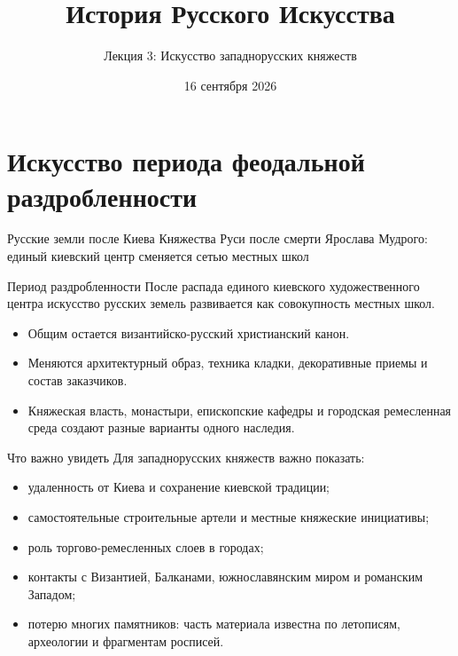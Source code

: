 
{
  \title{История Русского Искусства}
  \subtitle{Лекция 3: Искусство западнорусских княжеств}
  \date{16 сентября 2026}

  \begin{frame}
    \titlepage
  \end{frame}
}

\section{Искусство периода феодальной раздробленности}

\begin{frame}{Русские земли после Киева}
    {Княжества Руси после смерти Ярослава Мудрого:
     единый киевский центр сменяется сетью местных школ}
\end{frame}

\begin{frame}{Период раздробленности}
  После распада единого киевского художественного центра искусство
  русских земель развивается как совокупность местных школ.
  \begin{itemize}
    \item Общим остается византийско-русский христианский канон.
    \item Меняются архитектурный образ, техника кладки,
          декоративные приемы и состав заказчиков.
    \item Княжеская власть, монастыри, епископские кафедры и городская
          ремесленная среда создают разные варианты одного наследия.
  \end{itemize}
\end{frame}

\begin{frame}{Что важно увидеть}
  Для западнорусских княжеств важно показать:
  \begin{itemize}
    \item удаленность от Киева и сохранение киевской традиции;
    \item самостоятельные строительные артели и местные княжеские
          инициативы;
    \item роль торгово-ремесленных слоев в городах;
    \item контакты с Византией, Балканами, южнославянским миром
          и романским Западом;
    \item потерю многих памятников: часть материала известна по
          летописям, археологии и фрагментам росписей.
  \end{itemize}
\end{frame}

